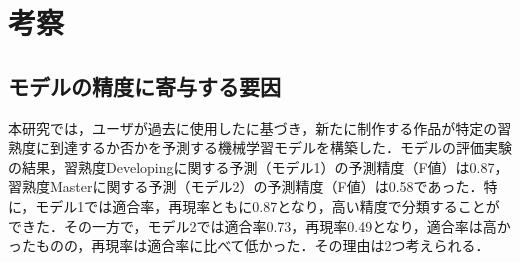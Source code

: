 \documentclass[submit]{ipsj}
\begin{document}
\section{考察}\label{sec:discussion}

\subsection{モデルの精度に寄与する要因}
本研究では，ユーザが過去に使用した\textcolor{red}{}に基づき，新たに制作する作品が特定の習熟度に到達するか否かを予測する機械学習モデルを構築した．モデルの評価実験の結果，習熟度Developingに関する予測（モデル1）の予測精度（F値）は0.87，習熟度Masterに関する予測（モデル2）の予測精度（F値）は0.58であった．特に，モデル1では適合率，再現率ともに0.87となり，高い精度で分類することができた．その一方で，モデル2では適合率0.73，再現率0.49となり，適合率は高かったものの，再現率は適合率に比べて低かった．その理由は2つ考えられる．
\end{document}
